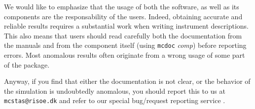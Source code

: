 We would like to emphasize that the usage of both the \MCS software, as well as its components are the responsability of the users. Indeed, obtaining accurate and reliable results requires a substantial work when writing instrument descriptions. This also means that users should read carefully both the documentation from the manuals \cite{mcstasmanual} and from the component itself (using \verb+mcdoc+ {\it comp}) before reporting errors. Most anomalous results often originate from a wrong usage of some part of the package.

Anyway, if you find that either the documentation is not clear, or the behavior of the simulation is undoubtedly anomalous, you should report this to us at \verb+mcstas@risoe.dk+ and refer to our special bug/request reporting service \cite{mczilla_webpage}.
